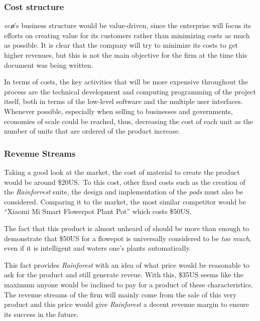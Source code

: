 \documentclass[english,runningheads,a4paper]{llncs}[2018/03/10]
\begin{document}
        \subsubsection*{Cost structure}

        \textit{ec\textbf{\o}}'s business structure would be value-driven, since
        the enterprise will focus its efforts on creating value for its
        customers rather than minimizing costs as much as possible. It is clear
        that the company will try to minimize its costs to get higher revenues,
        but this is not the main objective for the firm at the time this
        document was being written.

        In terms of costs, the key activities that will be more expensive
        throughout the process are the technical development and computing
        programming of the project itself, both in terms of the low-level
        software and the multiple user interfaces. Whenever possible, especially
        when selling to businesses and governments, economies of scale could be
        reached, thus, decreasing the cost of each unit as the number of units
        that are ordered of the product increase.


        \subsubsection*{Revenue Streams}


        Taking a good look at the market, the cost of material to create the
        product would be around \$20US.\ To this cost, other fixed costs such as
        the creation of the \textit{Rainforrest} suite, the design and
        implementation of the \textit{pods} must also be considered. Comparing 
        it to the market, the most similar competitor would be ``Xiaomi Mi Smart
        Flowerpot Plant Pot'' which costs \$50US.\

        The fact that this product is almost unheard of should be more than
        enough to demonstrate that \$50US for a flowepot is universally
        considered to be \textit{too much}, even if it is intelligent and waters
        one's plants automatically.

        This fact provides \textit{Rainforest} with an idea of what price would
        be reasonable to ask for the product and still generate reveue. With
        this, \$35US seems like the maximum anyone would be inclined to pay for
        a product of these characteristics. The revenue streams of the firm will
        mainly come from the sale of this very product and this price would give
        \textit{Rainforest} a decent revenue margin to ensure its success in the
        future.
\end{document}
